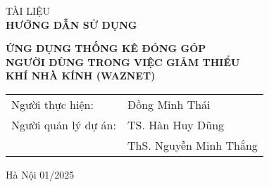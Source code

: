 
\begin{titlepage}
      
  \vspace*{\fill}
  \begin{center}
  \vspace{1.5cm}
  \fontsize{24pt}{0pt}\selectfont TÀI LIỆU \\ %
  \vspace{12pt}
  \textbf{\fontsize{32pt}{0pt}\selectfont HƯỚNG DẪN SỬ DỤNG} %
  \vspace{1.5cm}
  \end{center}
  \begin{center}
       \textbf{\fontsize{20pt}{0pt}\selectfont ỨNG DỤNG THỐNG KÊ ĐÓNG GÓP} \\
       \textbf{\fontsize{20pt}{0pt}\selectfont NGƯỜI DÙNG TRONG VIỆC GIẢM THIỂU } \\
       \textbf{\fontsize{20pt}{0pt}\selectfont KHÍ NHÀ KÍNH (WAZNET) }
  \vspace{3cm}
  \begin{table}[H]%
       \centering
       \begin{tabular}{l l}
            \fontsize{14pt}{0pt}\selectfont Người thực hiện:      & \fontsize{14pt}{0pt}\selectfont Đồng Minh Thái \vspace{10pt}\\
            \fontsize{14pt}{0pt}\selectfont Người quản lý dự án: & \fontsize{14pt}{0pt}\selectfont TS. Hàn Huy Dũng \\   
              &\fontsize{14pt}{0pt}\selectfont ThS. Nguyễn Minh Thắng \vspace{6pt} \\
       \end{tabular}
  \end{table}
  \vspace{6cm}
  \fontsize{14pt}{0pt}\selectfont Hà Nội 01/2025
  \end{center}
\end{titlepage}